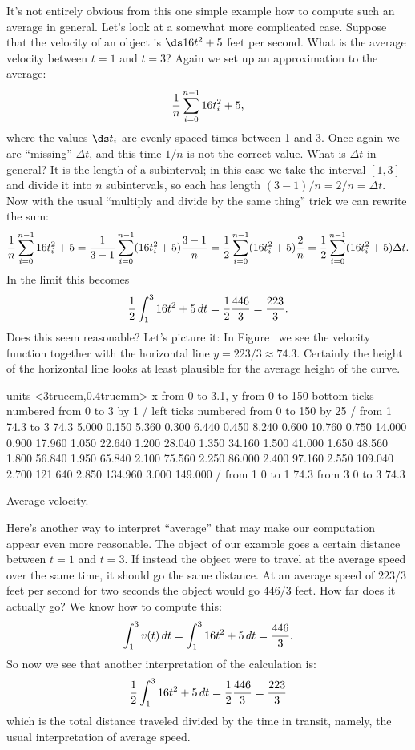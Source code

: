 It's not entirely obvious from this one simple example how to compute
such an average in general. Let's look at a somewhat more complicated
case. Suppose that the velocity of an object is $\ds 16
t^2+5$ feet per second. 
What is the average velocity between $t=1$ and $t=3$? Again we
set up an approximation to the average:
$${1\over n}\sum_{i=0}^{n-1} 16t_i^2+5,$$
where the values $\ds t_i$ are evenly spaced 
times between 1 and 3. Once again we are ``missing'' $\Delta t$, and
this time $1/n$ is not the correct value. What is $\Delta t$ in
general? It is the length of a subinterval; in this case we take the
interval $[1,3]$ and divide it into $n$ subintervals, so each
has length $(3-1)/n=2/n=\Delta t$. Now with the usual ``multiply and
divide by the same thing'' trick we can rewrite the sum:
$$
  {1\over n}\sum_{i=0}^{n-1} 16t_i^2+5=
  {1\over 3-1}\sum_{i=0}^{n-1} (16t_i^2+5){3-1\over n}=
  {1\over 2}\sum_{i=0}^{n-1} (16t_i^2+5){2\over n}=
  {1\over 2}\sum_{i=0}^{n-1} (16t_i^2+5)\Delta t.
$$
In the limit this becomes
$${1\over 2}\int_1^3 16t^2+5\,dt={1\over 2}{446\over 3}={223\over 3}.$$
Does this seem reasonable? Let's picture it: In
Figure~ we see the velocity function together
with the horizontal line $y=223/3\approx 74.3$. Certainly 
the height of the
horizontal line looks at least plausible for the average height of the
curve.

\figure[H]
\centerline{\vbox{\beginpicture
\normalgraphs
\setcoordinatesystem units <3truecm,0.4truemm>
\setplotarea x from 0 to 3.1, y from 0 to 150
\axis bottom ticks numbered from 0 to 3 by 1 /
\axis left ticks numbered from 0 to 150 by 25 /
\putrule from 1 74.3 to 3 74.3
\setquadratic
{} 5.000 0.150 5.360 0.300 6.440 0.450 8.240 0.600 10.760 
0.750 14.000 0.900 17.960 1.050 22.640 1.200 28.040 1.350 34.160 
1.500 41.000 1.650 48.560 1.800 56.840 1.950 65.840 2.100 75.560 
2.250 86.000 2.400 97.160 2.550 109.040 2.700 121.640 2.850 134.960 
3.000 149.000 /
\setdashes
\putrule from 1 0 to 1 74.3
\putrule from 3 0 to 3 74.3
\endpicture}}
\caption{\label{fig:average speed}
Average velocity.
}
\endfigure

Here's another way to interpret ``average'' that may make our
computation appear even more reasonable. The object of our example
goes a certain distance between $t=1$ and $t=3$. If instead the object
were to travel at the average speed over the same time, it should go
the same distance. At an average speed of $223/3$ feet per second for
two seconds the object would go $446/3$ feet. How far does it actually
go? We know how to compute this:
$$\int_1^3 v(t)\,dt = \int_1^3 16t^2+5\,dt={446\over 3}.$$
So now we see that another interpretation of the calculation is:
$${1\over 2}\int_1^3 16t^2+5\,dt={1\over 2}{446\over 3}={223\over 3}$$
which is the total distance traveled divided by the time in transit, namely,
the usual interpretation of average speed.

